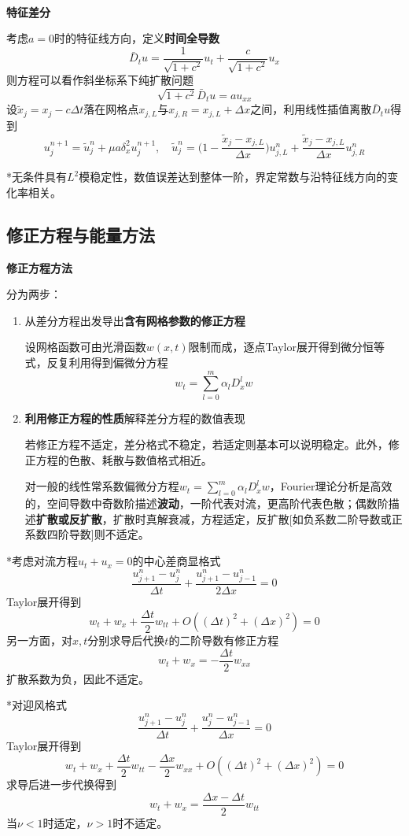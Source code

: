 \documentclass[a4paper,UTF8,fontset=windows]{ctexart}
\begin{document}
\

\textbf{特征差分}

考虑$a=0$时的特征线方向，定义\textbf{时间全导数}
$$\bar{D}_tu=\frac{1}{\sqrt{1+c^2}}u_t+\frac{c}{\sqrt{1+c^2}}u_x$$
则方程可以看作斜坐标系下纯扩散问题
$$\sqrt{1+c^2}\bar{D}_tu=au_{xx}$$
设$\tilde{x}_j=x_j-c\Delta t$落在网格点$x_{j,L}$与$x_{j,R}=x_{j,L}+\Delta x$之间，利用线性插值离散$\bar{D}_tu$得到
$$u_j^{n+1}=\tilde{u}_j^n+\mu a\delta_x^2u_j^{n+1},\quad\tilde{u}_j^n=\bigg(1-\frac{\tilde{x}_j-x_{j,L}}{\Delta x}\bigg)u_{j,L}^n+\frac{\tilde{x}_j-x_{j,L}}{\Delta x}u_{j,R}^n$$

*无条件具有$L^2$模稳定性，数值误差达到整体一阶，界定常数与沿特征线方向的变化率相关。

\subsection{修正方程与能量方法}
\textbf{修正方程方法}

分为两步：
\begin{enumerate}
    \item 从差分方程出发导出\textbf{含有网格参数的修正方程}
    
    设网格函数可由光滑函数$w(x,t)$限制而成，逐点Taylor展开得到微分恒等式，反复利用得到偏微分方程
    $$w_t=\sum_{l=0}^m\alpha_lD_x^lw$$

    \item \textbf{利用修正方程的性质}解释差分方程的数值表现
    
    若修正方程不适定，差分格式不稳定，若适定则基本可以说明稳定。此外，修正方程的色散、耗散与数值格式相近。

    对一般的线性常系数偏微分方程$w_t=\sum_{l=0}^m\alpha_lD_x^lw$，Fourier理论分析是高效的，空间导数中奇数阶描述\textbf{波动}，一阶代表对流，更高阶代表色散；偶数阶描述\textbf{扩散或反扩散}，扩散时真解衰减，方程适定，反扩散[如负系数二阶导数或正系数四阶导数]则不适定。
\end{enumerate}

*考虑对流方程$u_t+u_x=0$的中心差商显格式
$$\frac{u_{j+1}^n-u_j^n}{\Delta t}+\frac{u_{j+1}^n-u_{j-1}^n}{2\Delta x}=0$$
Taylor展开得到
$$w_t+w_x+\frac{\Delta t}{2}w_{tt}+O((\Delta t)^2+(\Delta x)^2)=0$$
另一方面，对$x,t$分别求导后代换$t$的二阶导数有修正方程
$$w_t+w_x=-\frac{\Delta t}{2}w_{xx}$$
扩散系数为负，因此不适定。

*对迎风格式
$$\frac{u_{j+1}^n-u_j^n}{\Delta t}+\frac{u_j^n-u_{j-1}^n}{\Delta x}=0$$
Taylor展开得到
$$w_t+w_x+\frac{\Delta t}{2}w_{tt}-\frac{\Delta x}{2}w_{xx}+O((\Delta t)^2+(\Delta x)^2)=0$$
求导后进一步代换得到
$$w_t+w_x=\frac{\Delta x-\Delta t}{2}w_{tt}$$
当$\nu<1$时适定，$\nu>1$时不适定。
\end{document}
